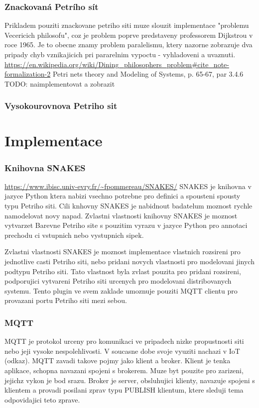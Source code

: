\subsection{Znackovaná Petrího sít}
Prikladem pouziti znackovane petriho siti muze slouzit implementace "problemu Vecericich philosofu", coz je problem poprve predstaveny professorem Dijkstrou v roce 1965.
Je to obecne znamy problem paralelismu, ktery nazorne zobrazuje dva pripady chyb vznikajicich pri pararelnim vypoctu - vyhladoveni a uvaznuti.
\url{https://en.wikipedia.org/wiki/Dining_philosophers_problem#cite_note-formalization-2} Petri nets theory and Modeling of Systems, p. 65-67, par 3.4.6
TODO: naimplementovat a zobrazit
\subsection{Vysokourovnova Petriho sit}
\chapter{Implementace}
\subsection{Knihovna SNAKES}
\url{https://www.ibisc.univ-evry.fr/~fpommereau/SNAKES/}
SNAKES je knihovna v jazyce Python ktera nabizi vsechno potrebne pro definici a spousteni spousty typu Petriho siti. Cili knhovny SNAKES je nabidnout badatelum moznost rychle namodelovat novy napad. Zvlastni vlastnosti knihovny SNAKES je moznost vytvarzet Barevne Petriho site s pouzitim vyrazu v jazyce Python pro annotaci prechodu ci vstupnich nebo vystupnich sipek.

Zvlastni vlastnosti SNAKES je moznost implementace vlastnich rozsireni pro jednotlive casti Petriho siti, nebo pridani novych vlastnosti pro modelovani jinych podtypu Petriho siti. Tato vlastnost byla zvlast pouzita pro pridani rozsireni, podporujici vytvareni Petriho siti urcenych pro modelovani distribovanych systemu.
Tento plugin ve svem zaklade umoznuje pouziti MQTT clientu pro provazani portu Petriho siti mezi sebou.
\subsection{MQTT}
MQTT je protokol urceny pro komunikaci ve pripadech nizke propustnosti siti nebo jeji vysoke nespolehlivosti. V soucasne dobe svoje vyuziti nachazi v IoT (odkaz). MQTT zavadi takove pojmy jako klient a broker. Klient je tenka aplikace, schopna navazani spojeni s brokerem. Muze byt pouzite pro zarizeni, jejichz vykon je bod srazu. Broker je server, obsluhujici klienty, navazuje spojeni s klientem a provadi posilani zprav typu PUBLISH klientum, ktere sleduji tema odpovidajici teto zprave.

